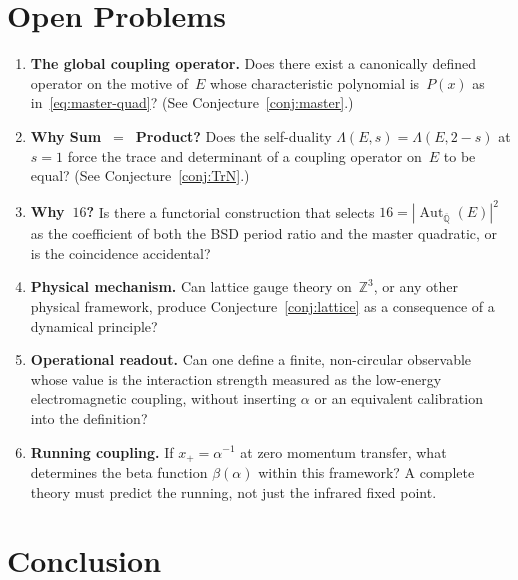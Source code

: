 \documentclass[12pt,reqno]{amsart}
\theoremstyle{definition}
\theoremstyle{remark}
\newcommand{\ZZ}{\mathbb{Z}}
\newcommand{\QQ}{\mathbb{Q}}
\newcommand{\Qbar}{\overline{\QQ}}
\newcommand{\Aut}{\operatorname{Aut}}
\begin{document}
\section{Open Problems}\label{sec:open}

\begin{enumerate}[label=(\arabic*)]
  \item \textbf{The global coupling operator.}
    Does there exist a canonically defined operator on the motive of~$E$ whose
    characteristic polynomial is~$P(x)$ as in~\eqref{eq:master-quad}?
    (See Conjecture~\ref{conj:master}.)

  \item \textbf{Why Sum~$=$~Product?}
    Does the self-duality $\Lambda(E,s)=\Lambda(E,2-s)$ at $s=1$ force the
    trace and determinant of a coupling operator on~$E$ to be equal?
    (See Conjecture~\ref{conj:TrN}.)

  \item \textbf{Why~$16$?}
    Is there a functorial construction that selects
    $16 = {|\Aut_{\Qbar}(E)|}^{2}$ as the coefficient of both the BSD period
    ratio and the master quadratic, or is the coincidence accidental?

  \item \textbf{Physical mechanism.}
    Can lattice gauge theory on~$\ZZ^{3}$, or any other physical framework,
    produce Conjecture~\ref{conj:lattice} as a consequence of a dynamical
    principle?

  \item \textbf{Operational readout.}
    Can one define a finite, non-circular observable whose value is the
    interaction strength measured as the low-energy electromagnetic coupling,
    without inserting $\alpha$ or an equivalent calibration into the definition?

  \item \textbf{Running coupling.}
    If $x_{+}=\alpha^{-1}$ at zero momentum transfer, what determines the
    beta function $\beta(\alpha)$ within this framework?  A complete theory
    must predict the running, not just the infrared fixed point.
\end{enumerate}


\section{Conclusion}\label{sec:conclusion}
\end{document}

